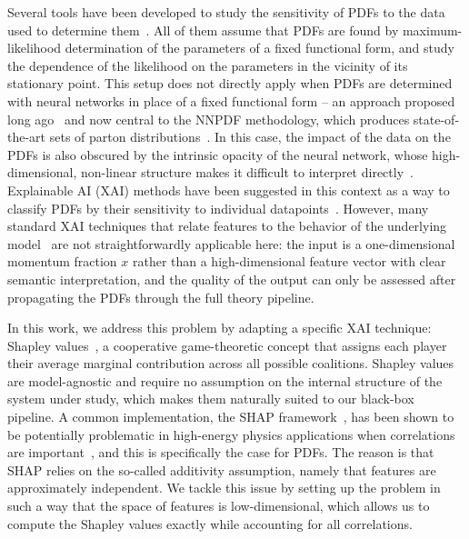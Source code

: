 \documentclass[11pt,a4paper]{article}
\begin{document}
Several tools have been developed to study the sensitivity of PDFs to the data used to determine them~\cite{Wang:2018heo,Jing:2023isu,PDF4LHCWorkingGroup:2022cjn}. All of them assume that PDFs are found by maximum-likelihood determination of the parameters of a fixed functional form, and study the dependence of the likelihood on the parameters in the vicinity of its stationary point.
This setup does not directly apply when PDFs are determined with neural networks in place of a fixed functional form -- an approach proposed long ago~\cite{Forte:2002fg} and now central to the NNPDF methodology, which produces state-of-the-art sets of parton distributions~\cite{NNPDF:2021njg}.
In this case, the impact of the data on the PDFs is also obscured by the intrinsic opacity of the neural network, whose high-dimensional, non-linear structure makes it difficult to interpret directly~\cite{lipton2016_blackbox}.
Explainable AI (XAI) methods have been suggested in this context as a way to classify PDFs by their sensitivity to individual datapoints~\cite{Kriesten:2024are}. 
However, many standard XAI techniques that relate features to the behavior of the underlying model~\cite{ribeiro2016whyitrustyou, shrikumar2019learningimportantfeaturespropagating,binder2016layerwiserelevancepropagationneural} are not straightforwardly applicable here: the input is a one-dimensional momentum fraction $x$ rather than a high-dimensional feature vector with clear semantic interpretation, and the quality of the output can only be assessed after propagating the PDFs through the full theory pipeline.

In this work, we address this problem by adapting a specific XAI technique: Shapley values~\cite{shapley_value1953}, a cooperative game-theoretic concept that assigns each player their average marginal contribution across all possible coalitions.
Shapley values are model-agnostic and require no assumption on the internal structure of the system under study, which makes them naturally suited to our black-box pipeline. 
A common implementation, the SHAP framework~\cite{lundberg2017unifiedapproachinterpretingmodel}, has been shown to be potentially problematic in high-energy physics applications when correlations are important~\cite{Vent:2025ddm}, and this is specifically  the case for PDFs.
The reason is that SHAP relies on the so-called additivity assumption, namely that features are approximately independent. We tackle this issue by setting up the problem in such a way that the space of features is low-dimensional, which allows us to compute the Shapley values exactly while accounting for all correlations.
\end{document}
